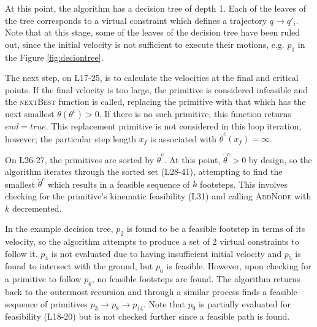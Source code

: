 At this point, the algorithm has a decision tree of depth 1. Each of the leaves of the tree corresponds to a virtual constraint which defines a trajectory $q\to q'_i$. Note that at this stage, some of the leaves of the decision tree have been ruled out, since the initial velocity is not sufficient to execute their motions, e.g. $p_1$ in the Figure \ref{fig:deciontree}.

The next step, on L17-25, is to calculate the velocities at the final and critical points. If the final velocity is too large, the primitive is considered infeasible and the \textsc{nextBest} function is called, replacing the primitive with that which has the next smallest $\dot{\theta}(\theta^c)>0$. If there is no such primitive, this function returns $end=true$. This replacement primitive is not considered in this loop iteration, however; the particular step length $x_f$ is associated with $\dot{\theta}^c(x_f) = \infty$.

On L26-27, the primitives are sorted by $\dot{\theta}^c$. At this point, $\dot{\theta}^c > 0$ by design, so the algorithm iterates through the sorted set (L28-41), attempting to find the smallest $\dot{\theta}^c$ which results in a feasible sequence of $k$ footsteps. This involves checking for the primitive's kinematic feasibility (L31) and calling \textsc{AddNode} with $k$ decremented.

In the example decision tree, $p_2$ is found to be a feasible footstep in terms of its velocity, so the algorithm attempts to produce a set of 2 virtual constraints to follow it. $p_4$ is not evaluated due to having insufficient initial velocity and $p_5$ is found to intersect with the ground, but $p_6$ is feasible. However, upon checking for a primitive to follow $p_6$, no feasible footsteps are found. The algorithm returns back to the outermost recursion and through a similar process finds a feasible sequence of primitives $p_3\to p_8 \to p_{14}$. Note that $p_9$ is partially evaluated for feasibility (L18-20) but is not checked further since a feasible path is found.

